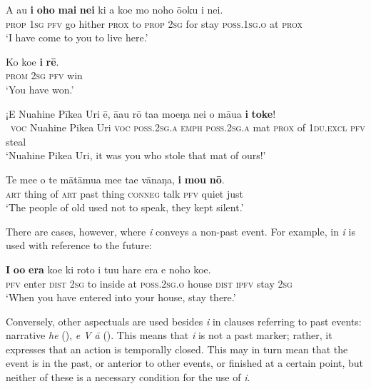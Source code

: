 \ea\label{ex:7.14}
\gll A au \textbf{i} \textbf{oho} \textbf{mai} \textbf{nei} ki a koe mo noho ō{\ꞌ}oku {\ꞌ}i nei. \\
\textsc{prop} \textsc{1sg} \textsc{pfv} go hither \textsc{prox} to \textsc{prop} \textsc{2sg} for stay \textsc{poss.1sg.o} at \textsc{prox} \\

\glt 
‘I have come to you to live here.’ \textstyleExampleref{[R245.072]} 
\z

\ea\label{ex:7.15}
\gll Ko koe \textbf{i} \textbf{rē}. \\
\textsc{prom} \textsc{2sg} \textsc{pfv} win \\

\glt 
‘You have won.’ \textstyleExampleref{[R210.071]} 
\z

\ea\label{ex:7.16}
\gll ¡E Nuahine Pīkea {\ꞌ}Uri ē, {\ꞌ}ā{\ꞌ}au rō ta{\ꞌ}a moeŋa nei o māua \textbf{i} \textbf{toke}! \\
~\textsc{voc} Nuahine Pikea Uri \textsc{voc} \textsc{poss.2sg.a} \textsc{emph} \textsc{poss.2sg.a} mat \textsc{prox} of \textsc{1du.excl} \textsc{pfv} steal \\

\glt 
‘Nuahine Pikea Uri, it was you who stole that mat of ours!’ \textstyleExampleref{[R310.428]} 
\z

\ea\label{ex:7.17}
\gll Te me{\ꞌ}e o te mātāmu{\ꞌ}a me{\ꞌ}e ta{\ꞌ}e vānaŋa, \textbf{i} \textbf{mou} \textbf{nō}. \\
\textsc{art} thing of \textsc{art} past thing \textsc{conneg} talk \textsc{pfv} quiet just \\

\glt
‘The people of old used not to speak, they kept silent.’ \textstyleExampleref{[R310.216]} 
\z

There are cases, however, where \textit{i} conveys a non-past event. For example, in  \textit{i} is used with reference to the future:

\ea\label{ex:7.18}
\gll \textbf{I} \textbf{o{\ꞌ}o} \textbf{era} koe ki roto i tu{\ꞌ}u hare era e noho koe. \\
\textsc{pfv} enter \textsc{dist} \textsc{2sg} to inside at \textsc{poss.2sg.o} house \textsc{dist} \textsc{ipfv} stay \textsc{2sg} \\

\glt
‘When you have entered into your house, stay there.’ \textstyleExampleref{[R310.297]} 
\z

Conversely, other aspectuals are used besides \textit{i} in clauses referring to past events: narrative \textit{he} (),  \textit{e V {\ꞌ}ā} (). This means that \textit{i} is not a past  marker; rather, it expresses that an action is temporally closed. This may in turn mean that the event is in the past, or anterior to other events, or finished at a certain point, but neither of these is a necessary condition for the use of \textit{i}.


